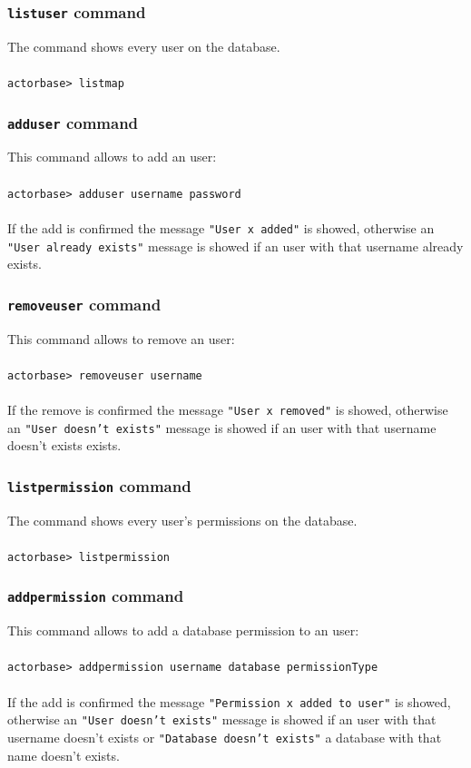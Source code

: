 \documentclass[a4paper]{article}
\begin{document}
	\subsubsection{\texttt{listuser} command}
	The command shows every user on the database.
	\\ \\
	\texttt{actorbase>	listmap}

	\subsubsection{\texttt{adduser} command}
	This command allows to add an user:
	\\ \\
	\texttt{actorbase>	adduser username password}
	\\ \\
	If the add is confirmed the message \texttt{"User x added"} is showed, otherwise an \texttt{"User already exists"} message is showed if an user with that username already exists.

	\subsubsection{\texttt{removeuser} command}
	This command allows to remove an user:
	\\ \\
	\texttt{actorbase>	removeuser username}
	\\ \\
	If the remove is confirmed the message \texttt{"User x removed"} is showed, otherwise an \texttt{"User doesn't exists"} message is showed if an user with that username doesn't exists exists.
	
	\subsubsection{\texttt{listpermission} command}
	The command shows every user's permissions on the database.
	\\ \\
	\texttt{actorbase> listpermission}

	\subsubsection{\texttt{addpermission} command}
	This command allows to add a database permission to an user:
	\\ \\
	\texttt{actorbase>	addpermission username database permissionType}
	\\ \\
	If the add is confirmed the message \texttt{"Permission x added to user"} is showed, otherwise an \texttt{"User doesn't exists"} message is showed if an user with that username doesn't exists or \texttt{"Database doesn't exists"} a database with that name doesn't exists.
\end{document}
